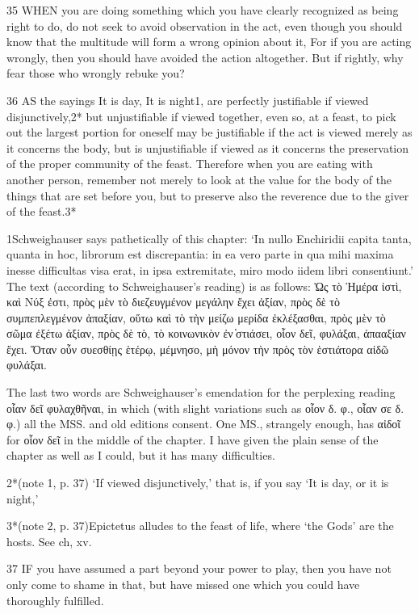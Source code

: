    35   WHEN you are doing something which you have clearly recognized as being right to do, do not seek to avoid observation in the act, even though you should know that the multitude will form a wrong opinion about it, For if you are acting wrongly, then you should have avoided the action altogether. But if rightly, why fear those who wrongly rebuke you?

   36   AS the sayings It is day, It is night1, are perfectly justifiable if viewed disjunctively,2* but unjustifiable if viewed together, even so, at a feast, to pick out the largest portion for oneself may be justifiable if the act is viewed merely as it concerns the body, but is unjustifiable if viewed as it concerns the preservation of the proper community of the feast. Therefore when you are eating with another person, remember not merely to look at the value for the body of the things that are set before you, but to preserve also the reverence due to the giver of the feast.3*

   1Schweighauser says pathetically of this chapter: ‘In nullo Enchiridii capita tanta, quanta in hoc, librorum est discrepantia: in ea vero parte in qua mihi maxima inesse difficultas visa erat, in ipsa extremitate, miro modo iidem libri consentiunt.’ The text (according to Schweighauser’s reading) is as follows: Ὡς τὸ Ἡμέρα ἰστὶ, καὶ Νύξ ἐστι, πρὸς μὲν τὸ διεζευγμένον μεγάλην ἔχει ἀξίαν, πρὸς δὲ τὸ συμπεπλεγμένον ἀπαξίαν, οὕτω καὶ τὸ τὴν μείζω μερίδα ἐκλέξασθαι, πρὸς μὲν τὸ σῶμα ἐξέτω ἀξίαν, πρὸς δὲ τὸ, τὸ κοινωνικὸν ἐν ̔στιάσει, οἷον δεῖ, φυλάξαι, ἀπααξίαν ἔχει. Ὅταν οὖν συεσθίῃς ἑτέρῳ, μέμνησο, μὴ μόνον τὴν πρὸς τὸν ἑστιάτορα αἰδῶ φυλάξαι.

    The last two words are Schweighauser’s emendation for the perplexing reading οἷαν δεῖ φυλαχθῆναι, in which (with slight variations such as οἷον δ. φ., οἷαν σε δ. φ.) all the MSS. and old editions consent. One MS., strangely enough, has αἰδοῖ for οἷον δεῖ in the middle of the chapter.  I have given the plain sense of the chapter as well as I could, but it has many difficulties.

    2*(note 1, p. 37) ‘If viewed disjunctively,’ that is, if you say ‘It is day, or it is night,’

    3*(note 2, p. 37)Epictetus alludes to the feast of life, where ‘the Gods’ are the hosts. See ch, xv.

    37   IF you have assumed a part beyond your power to play, then you have not only come to shame in that, but have missed one which you could have thoroughly fulfilled.

